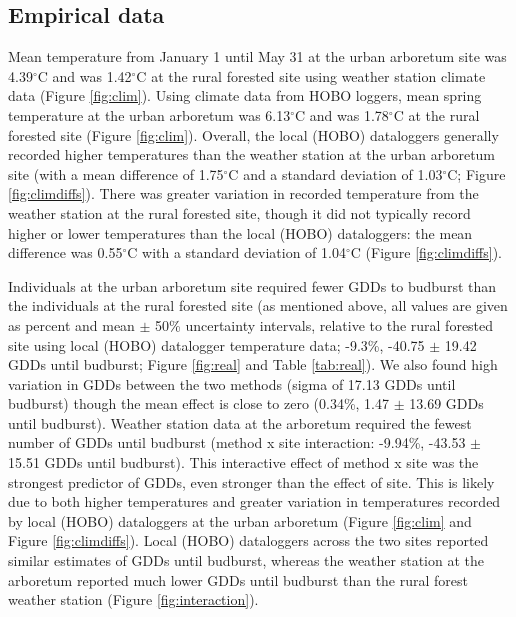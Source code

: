 \documentclass{article}\usepackage[]{graphicx}\usepackage[]{color}
\begin{document}
\subsection{Empirical data} 
Mean temperature from January 1 until May 31 at the urban arboretum site was 4.39$^{\circ}$C and was 1.42$^{\circ}$C at the rural forested site using weather station climate data (Figure \ref{fig:clim}). Using climate data from HOBO loggers, mean spring temperature at the urban arboretum was 6.13$^{\circ}$C and was 1.78$^{\circ}$C at the rural forested site (Figure \ref{fig:clim}). Overall, the local (HOBO) dataloggers generally recorded higher temperatures than the weather station at the urban arboretum site (with a mean difference of 1.75$^{\circ}$C and a standard deviation of 1.03$^{\circ}$C; Figure \ref{fig:climdiffs}). There was greater variation in recorded temperature from the weather station at the rural forested site, though it did not typically record higher or lower temperatures than the local (HOBO) dataloggers: the mean difference was 0.55$^{\circ}$C with a standard deviation of 1.04$^{\circ}$C (Figure \ref{fig:climdiffs}). 

Individuals at the urban arboretum site required fewer GDDs to budburst than the individuals at the rural forested site (as mentioned above, all values are given as percent and mean $\pm$ 50\% uncertainty intervals, relative to the rural forested site using local (HOBO) datalogger temperature data; -9.3\%, -40.75 $\pm$ 19.42 GDDs until budburst; Figure \ref{fig:real} and Table \ref{tab:real}). We also found high variation in GDDs between the two methods (sigma of 17.13 GDDs until budburst) though the mean effect is close to zero (0.34\%, 1.47 $\pm$ 13.69 GDDs until budburst). Weather station data at the arboretum required the fewest number of GDDs until budburst (method x site interaction: -9.94\%, -43.53 $\pm$ 15.51 GDDs until budburst). This interactive effect of method x site was the strongest predictor of GDDs, even stronger than the effect of site. This is likely due to both higher temperatures and greater variation in temperatures recorded by local (HOBO) dataloggers at the urban arboretum (Figure \ref{fig:clim} and Figure \ref{fig:climdiffs}). Local (HOBO) dataloggers across the two sites reported similar estimates of GDDs until budburst, whereas the weather station at the arboretum reported much lower GDDs until budburst than the rural forest weather station (Figure \ref{fig:interaction}).
\end{document}
